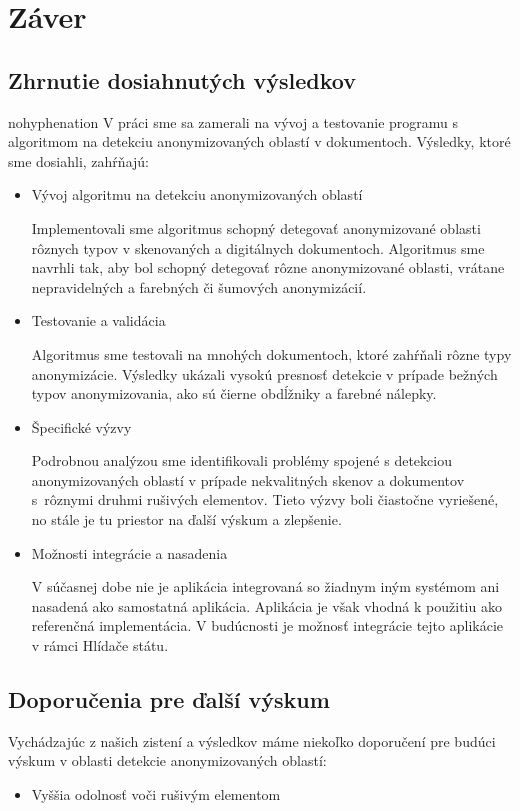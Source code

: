 \label{chap:conclusion}
\chapter{Záver}
\section{Zhrnutie dosiahnutých výsledkov}
\begin{hyphenrules}{nohyphenation}
V práci sme sa zamerali na vývoj a testovanie programu s algoritmom na detekciu anonymizovaných oblastí v dokumentoch. Výsledky, ktoré sme dosiahli, zahŕňajú:
\begin{itemize}
    \item Vývoj algoritmu na detekciu anonymizovaných oblastí

    Implementovali sme algoritmus schopný detegovať anonymizované oblasti rôznych typov v skenovaných a digitálnych dokumentoch. Algoritmus sme navrhli tak, aby bol schopný detegovať rôzne anonymizované oblasti, vrátane nepravidelných a farebných či šumových anonymizácií.
    \item Testovanie a validácia

    Algoritmus sme testovali na mnohých dokumentoch, ktoré zahŕňali rôzne typy anonymizácie. Výsledky ukázali vysokú presnosť detekcie v prípade bežných typov anonymizovania, ako sú čierne obdĺžniky a farebné nálepky.
    \item Špecifické výzvy

    Podrobnou analýzou sme identifikovali problémy spojené s detekciou anonymizovaných oblastí v prípade nekvalitných skenov a dokumentov s~rôznymi druhmi rušivých elementov. Tieto výzvy boli čiastočne vyriešené, no stále je tu priestor na ďalší výskum a zlepšenie.

    \item Možnosti integrácie a nasadenia

    V súčasnej dobe nie je aplikácia integrovaná so žiadnym iným systémom ani nasadená ako samostatná aplikácia. Aplikácia je však vhodná k použitiu ako referenčná implementácia. V budúcnosti je možnosť integrácie tejto aplikácie v rámci Hlídače státu\cite{HlidacStatu}.
\newline 

\end{itemize}

\section{Doporučenia pre ďalší výskum}
Vychádzajúc z našich zistení a výsledkov máme niekoľko doporučení pre budúci výskum v oblasti detekcie anonymizovaných oblastí:
\begin{itemize}
    \item Vyššia odolnosť voči rušivým elementom


\end{itemize}
\end{hyphenrules}
